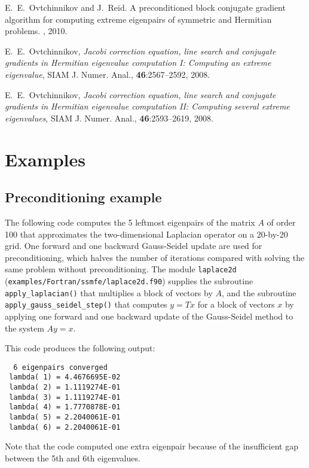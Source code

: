 E.~E.~Ovtchinnikov and J.~Reid.
A preconditioned block conjugate gradient
algorithm for computing extreme eigenpairs
of symmetric and Hermitian problems.
\report, 2010.

E.~E.~Ovtchinnikov,
{\em Jacobi correction equation, line search and
conjugate gradients in Hermitian eigenvalue computation I:
Computing an extreme eigenvalue},
SIAM J. Numer. Anal., {\bf 46}:2567--2592, 2008.

E.~E.~Ovtchinnikov,
{\em Jacobi correction equation, line search and
conjugate gradients in Hermitian eigenvalue computation II:
Computing several extreme eigenvalues},
SIAM J. Numer. Anal., {\bf 46}:2593--2619, 2008.

\section{Examples}

\subsection{Preconditioning example}
\label{sec:ex.prec}

The following code 
computes the 5 leftmost eigenpairs of 
the matrix $A$ of order 100 that approximates 
the two-dimensional Laplacian operator
on a 20-by-20 grid.
One forward and one backward Gauss-Seidel update
are used for preconditioning,
which halves the number of iterations
compared with solving the same problem without preconditioning.
The module {\tt laplace2d} (\texttt{examples/Fortran/ssmfe/laplace2d.f90})
supplies the subroutine {\tt apply\_laplacian()}
that multiplies a block of vectors by $A$,
and the subroutine 
{\tt apply\_gauss\_seidel\_step()}
that computes $y = T x$ for a block of vectors $x$
by applying one forward and one backward update
of the Gauss-Seidel method to the system $A y = x$.

This code produces the following output:
\begin{verbatim}
  6 eigenpairs converged
 lambda( 1) = 4.4676695E-02
 lambda( 2) = 1.1119274E-01
 lambda( 3) = 1.1119274E-01
 lambda( 4) = 1.7770878E-01
 lambda( 5) = 2.2040061E-01
 lambda( 6) = 2.2040061E-01
\end{verbatim}

Note that the code computed one extra eigenpair
because of the insufficient gap between the 5th and 6th
eigenvalues.
